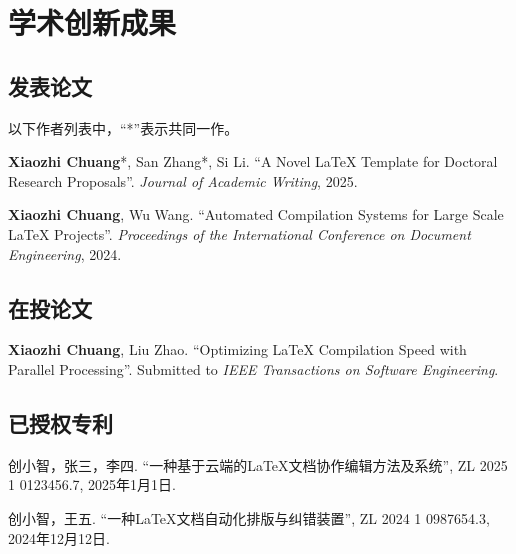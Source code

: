 \chapter{学术创新成果}
\label{chap:plan}
\section{发表论文}

以下作者列表中，“*”表示共同一作。
\begin{enumerate}[label={[\arabic*]}]
    \item \textbf{Xiaozhi Chuang}*, San Zhang*, Si Li. ``A Novel LaTeX Template for Doctoral Research Proposals''. \textit{Journal of Academic Writing}, 2025.
    \item \textbf{Xiaozhi Chuang}, Wu Wang. ``Automated Compilation Systems for Large Scale LaTeX Projects''. \textit{Proceedings of the International Conference on Document Engineering}, 2024.
\end{enumerate}
    
\section{在投论文}
\begin{enumerate}[label={[\arabic*]}]
\item \textbf{Xiaozhi Chuang}, Liu Zhao. ``Optimizing LaTeX Compilation Speed with Parallel Processing''. Submitted to \textit{IEEE Transactions on Software Engineering}.
\end{enumerate}

\section{已授权专利}

\begin{enumerate}[label={[\arabic*]}]
\item 创小智，张三，李四. ``一种基于云端的LaTeX文档协作编辑方法及系统'', ZL 2025 1 0123456.7, 2025年1月1日.
\item 创小智，王五. ``一种LaTeX文档自动化排版与纠错装置'', ZL 2024 1 0987654.3, 2024年12月12日.
\end{enumerate}


\clearpage